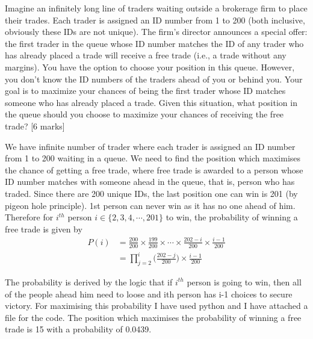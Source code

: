 \begin{que}
	Imagine an infinitely long line of traders waiting outside a brokerage
	firm to place their trades. Each trader is assigned an ID number from 1
	to 200 (both inclusive, obviously these IDs are not unique). The firm’s
	director announces a special offer: the first trader in the queue whose
	ID number matches the ID of any trader who has already placed a trade
	will receive a free trade (i.e., a trade without any margins). You have
	the option to choose your position in this queue.   However, you don’t
	know the ID numbers of the traders ahead of you or behind you. Your
	goal is to maximize your chances of being the first trader whose ID
	matches someone who has already placed a trade. Given this situation,
	what position in the queue should you choose to maximize your chances
	of receiving the free trade?
	\hspace*{\fill} [6 marks]
\end{que}
\begin{tcolorbox}[breakable]
	\begin{sol}
		We have infinite number of trader where each trader is assigned
		an ID number from 1 to 200 waiting in a queue. We need to find
		the position which maximises the chance of getting a free
		trade, where free trade is awarded to a person whose ID number
		matches with someone ahead in the queue, that is, person who
		has traded. Since there are 200 unique IDs, the last position
		one can win is 201 (by pigeon hole principle). 1st person can
		never win as it has no one ahead of him. Therefore for $i^{th}$
		person $i \in \{2,3,4,\cdots,201 \}$ to win, the probability of
		winning a free trade is given by
		\begin{align}
			P(i) & = \frac{200}{200} \times \frac{199}{200} \times \cdots \times \frac{202 - i}{200} \times \frac{i-1}{200} \\
			     & = \prod_{j=2}^{i} \Bigg( \frac{202 - j}{200} \Bigg) \times \frac{i - 1}{200}
		\end{align}

		The probability is derived by the logic that if $i^{th}$ person
		is going to win, then all of the people ahead him need to loose
		and ith person has i-1 choices to secure victory. For maximising
		this probability I have used python and I have attached a file
		for the code. The position which maximises the probability of
		winning a free trade is 15 with a probability of 0.0439.

	\end{sol}
\end{tcolorbox}
